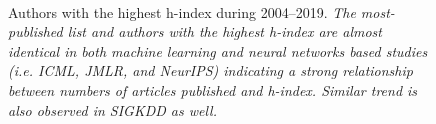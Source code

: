 \begin{figure}[!htbp]
	\begin{center}
	\\
	\end{center}
	\caption{Authors with the highest h-index during 2004--2019. \textit{The most-published list and authors with the highest h-index are almost identical in both machine learning and neural networks based studies (i.e. ICML, JMLR, and NeurIPS) indicating a strong relationship between numbers of articles published and h-index. Similar trend is also observed in SIGKDD as well.}}
	\label{fig:cited_top_hindex}
\end{figure}


